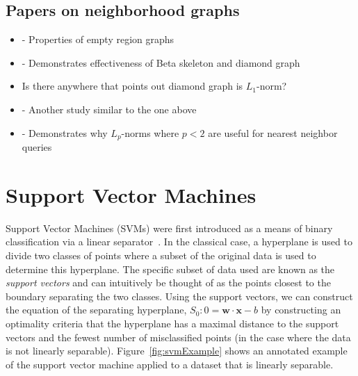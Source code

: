 \documentclass[12pt]{article}
\begin{document}
\subsection{Papers on neighborhood graphs}

\begin{itemize}
	\item \cite{CardinalColletteLangerman2009} - Properties of empty region
	graphs
	\item \cite{CorreaLindstrom2011} - Demonstrates effectiveness of Beta
	skeleton and diamond graph
	\item Is there anywhere that points out diamond graph is $L_1$-norm?
	\item \cite{MaljovecSahaLindstrom2013} - Another study similar to the one
	above
	\item \cite{AggarwalHinneburgKeim2001} - Demonstrates why $L_p$-norms where
	$p<2$ are useful for nearest neighbor queries
\end{itemize}



\section{Support Vector Machines}

Support Vector Machines (SVMs) were first introduced as a means of binary
classification via a linear separator~\cite{VapnikLerner1963}.
%
In the classical case, a hyperplane is used to divide two classes of points
where a subset of the original data is used to determine this hyperplane.
%
The specific subset of data used are known as the \emph{support vectors} and can
intuitively be thought of as the points closest to the boundary separating the
two classes.
%
Using the support vectors, we can construct the equation of the separating
hyperplane, $S_0: 0 = \mathbf{w} \cdot \mathbf{x} - b$ by constructing an
optimality criteria that the hyperplane has a maximal distance to the support
vectors and the fewest number of misclassified points (in the case where the
data is not linearly separable).
%
Figure~\ref{fig:svmExample} shows an annotated example of the support vector
machine applied to a dataset that is linearly separable.
\end{document}
